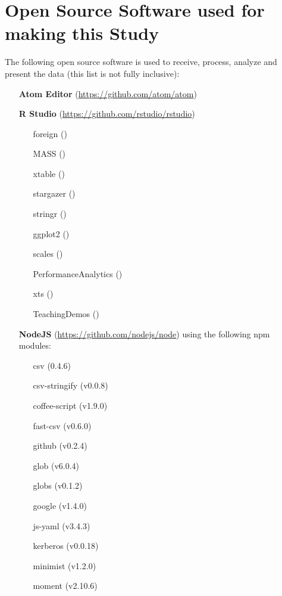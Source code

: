 \section{Open Source Software used for making this Study}

The following open source software is used to receive, process, analyze and present the data (this list is not fully inclusive):

\begin{itemize}
  \item [\textbf{Atom Editor}] (\url{https://github.com/atom/atom})
  \item [\textbf{R Studio}] (\url{https://github.com/rstudio/rstudio})
  \begin{itemize}
    \item [foreign] (\cite{R_foreign})
    \item [MASS] (\cite{R_MASS})
    \item [xtable] (\cite{R_xtable})
    \item [stargazer] (\cite{R_stargazer})
    \item [stringr] (\cite{R_stringr})
    \item [ggplot2] (\cite{R_ggplot2})
    \item [scales] (\cite{R_scales})
    \item [PerformanceAnalytics] (\cite{R_PerformanceAnalytics})
    \item [xts] (\cite{R_xts})
    \item [TeachingDemos] (\cite{R_TeachingDemos})
  \end{itemize}
  \item [\textbf{NodeJS}] (\url{https://github.com/nodejs/node}) using the following npm modules:
  \begin{itemize}
    \item [csv] (0.4.6)
    \item [csv-stringify] (v0.0.8)
    \item [coffee-script] (v1.9.0)
    \item [fast-csv] (v0.6.0)
    \item [github] (v0.2.4)
    \item [glob] (v6.0.4)
    \item [globs] (v0.1.2)
    \item [google] (v1.4.0)
    \item [js-yaml] (v3.4.3)
    \item [kerberos] (v0.0.18)
    \item [minimist] (v1.2.0)
    \item [moment] (v2.10.6)

\end{itemize}
\end{itemize}
